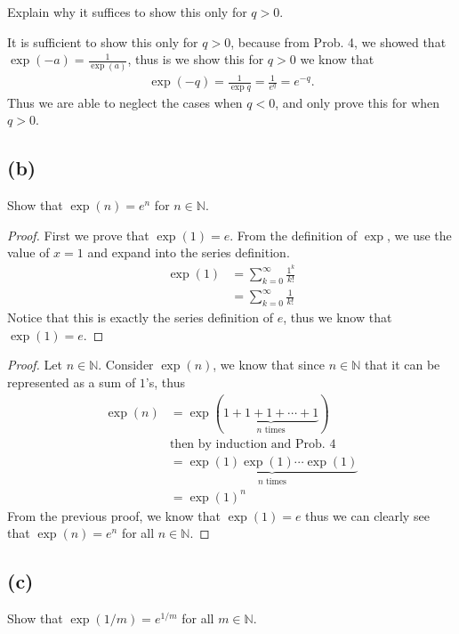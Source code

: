\documentclass[12pt]{amsart}
\newcommand{\prob}[1]{Prob. #1}
\newcommand{\N}{\mathbb{N}}
\begin{document}
Explain why it suffices to show this only for $q>0$.

It is sufficient to show this only for $q>0$, because from \prob{4}, we showed
that $\exp(-a)=\frac{1}{\exp(a)}$, thus is we show this for $q>0$ we know that
\begin{align*}
  \exp(-q)=\frac{1}{\exp{q}}=\frac{1}{e^q}=e^{-q}.
\end{align*}
Thus we are able to neglect the cases when $q<0$, and only prove this for when
$q>0$.

\subsection*{(b)}%
\label{sub:_b_}

Show that $\exp(n)=e^n$ for $n\in\N$.

\begin{proof}
  First we prove that $\exp(1)=e$. From the definition of $\exp$, we use the
  value of $x=1$ and expand into the series definition.
  \begin{align*}
    \exp(1)&=\sum_{k=0}^\infty\frac{1^k}{k!}\\
           &=\sum_{k=0}^\infty\frac{1}{k!}
  \end{align*}
  Notice that this is exactly the series definition of $e$, thus we know that
  $\exp(1)=e$.
\end{proof}

\begin{proof}
  Let $n\in\N$. Consider $\exp(n)$, we know that since $n\in\N$ that it can be
  represented as a sum of $1$'s, thus
  \begin{align*}
    \exp(n)&=\exp(\underbrace{1+1+1+\cdots+1}_\text{$n$ times})\\
           &\text{then by induction and \prob{4}}\\
           &=\underbrace{\exp(1)\exp(1)\cdots\exp(1)}_\text{$n$ times}\\
           &=\exp(1)^n
  \end{align*}
  From the previous proof, we know that $\exp(1)=e$ thus we can clearly see
  that $\exp(n)=e^n$ for all $n\in\N$.
\end{proof}

\subsection*{(c)}%
\label{sub:_c_}

Show that $\exp(1/m)=e^{1/m}$ for all $m\in\N$.
\end{document}
